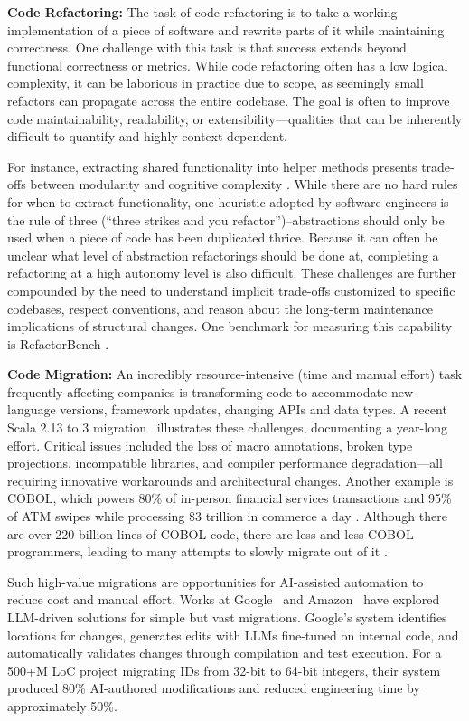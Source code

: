\textbf{Code Refactoring:} The task of code refactoring is to take a working implementation of a piece of software and rewrite parts of it while maintaining correctness. One challenge with this task is that success extends beyond functional correctness or metrics. While code refactoring often has a low logical complexity, it can be laborious in practice due to scope, as seemingly small refactors can propagate across the entire codebase. The goal is often to improve code maintainability, readability, or extensibility—qualities that can be inherently difficult to quantify and highly context-dependent. 

For instance, extracting shared functionality into helper methods presents trade-offs between modularity and cognitive complexity \citep{parnas1972criteria}. While there are no hard rules for when to extract functionality, one heuristic adopted by software engineers is the rule of three (``three strikes and you refactor'')--abstractions should only be used when a piece of code has been duplicated thrice. Because it can often be unclear what level of abstraction refactorings should be done at, completing a refactoring at a high autonomy level is also difficult. These challenges are further compounded by the need to understand implicit trade-offs customized to specific codebases, respect conventions, and reason about the long-term maintenance implications of structural changes. One benchmark for measuring this capability is RefactorBench \citep{gautam2024refactorbench}.

\textbf{Code Migration:} An incredibly resource-intensive (time and manual effort) task frequently affecting companies is transforming code to accommodate new language versions, framework updates, changing APIs and data types. A recent Scala 2.13 to 3 migration~\citep{scalamigrate} illustrates these challenges, documenting a year-long effort. Critical issues included the loss of macro annotations, broken type projections, incompatible libraries, and compiler performance degradation—all requiring innovative workarounds and architectural changes. Another example is COBOL, which powers 80\% of in-person financial services transactions and 95\% of ATM swipes while processing \$3 trillion in commerce a day \citep{Taulli_2020}. Although there are over 220 billion lines of COBOL code, there are less and less COBOL programmers, leading to many attempts to slowly migrate out of it \citep{sneed2001extracting, sellink2002restructuring, sneed2010migrating}.

Such high-value migrations are opportunities for AI-assisted automation to reduce cost and manual effort. Works at Google~\citep{nikolov2025google} and Amazon~\citep{omidvar2024evaluating} have explored LLM-driven solutions for simple but vast migrations.
% 
Google's system identifies locations for changes, generates edits with LLMs fine-tuned on internal code, and automatically validates changes through compilation and test execution.
% 
For a 500+M LoC project migrating IDs from 32-bit to 64-bit integers, their system produced 80\% AI-authored modifications and reduced engineering time by approximately 50\%. 

